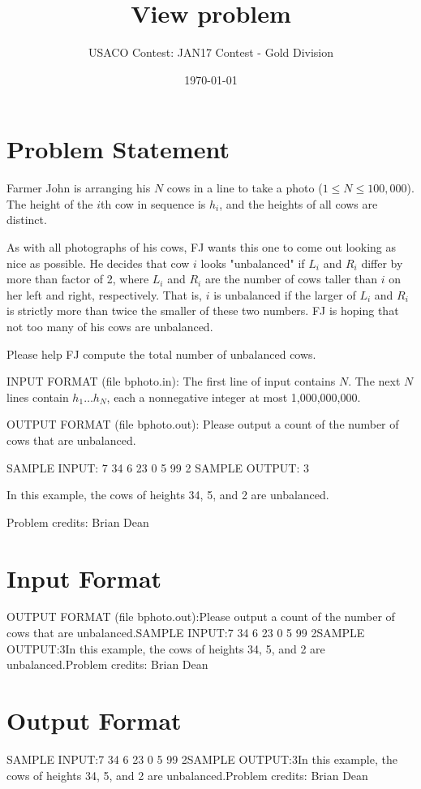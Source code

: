 \documentclass[12pt]{article}
\title{View problem}
\author{USACO Contest: JAN17 Contest - Gold Division}
\date{\today}
\begin{document}
\maketitle

\section*{Problem Statement}

Farmer John is arranging his $N$ cows in a line to take a photo
($1 \leq N \leq 100,000$).  The height of the $i$th cow in sequence is $h_i$,
and the heights of all cows are distinct.

As with all photographs of his cows, FJ wants this one to come out looking as
nice as possible.  He decides that cow $i$ looks "unbalanced" if $L_i$ and $R_i$
differ by more than factor of 2, where $L_i$ and $R_i$ are the number of cows
taller than $i$ on her left and right, respectively.  That is, $i$ is unbalanced
if the larger of $L_i$ and $R_i$ is strictly more than twice the smaller of
these two numbers.  FJ is hoping that not too many of his cows are unbalanced.

Please help FJ compute the total number of unbalanced cows.

INPUT FORMAT (file bphoto.in):
The first line of input contains $N$.  The next $N$ lines contain
$h_1 \ldots h_N$, each a nonnegative integer at most 1,000,000,000.

OUTPUT FORMAT (file bphoto.out):
Please output a count of the number of cows that are unbalanced.

SAMPLE INPUT:
7
34
6
23
0
5
99
2
SAMPLE OUTPUT: 
3

In this example, the cows of heights 34, 5, and 2 are unbalanced.


Problem credits: Brian Dean



\section*{Input Format}
OUTPUT FORMAT (file bphoto.out):Please output a count of the number of cows that are unbalanced.SAMPLE INPUT:7
34
6
23
0
5
99
2SAMPLE OUTPUT:3In this example, the cows of heights 34, 5, and 2 are unbalanced.Problem credits: Brian Dean

\section*{Output Format}
SAMPLE INPUT:7
34
6
23
0
5
99
2SAMPLE OUTPUT:3In this example, the cows of heights 34, 5, and 2 are unbalanced.Problem credits: Brian Dean
\end{document}
